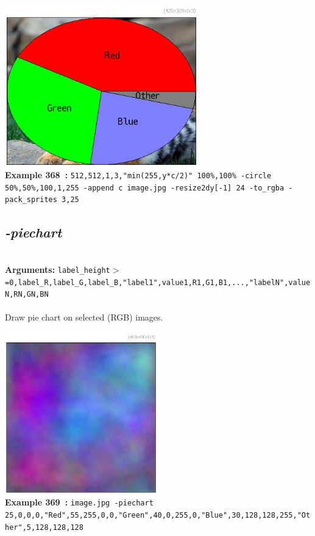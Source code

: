 \documentclass[a4paper,11pt,twoside]{book}
\begin{document}
\begin{center}\includegraphics[keepaspectratio=true,height=7cm,width=\textwidth]{img/gmic_def368.jpg}\\
{\footnotesize \textbf{Example 368~:} \texttt{512,512,1,3,"min(255,y*c/2)" 100\%,100\% -circle 50\%,50\%,100,1,255 -append c image.jpg -resize2dy[-1] 24 -to\_rgba -pack\_sprites 3,25}}
\end{center}

\subsection{\emph{-piechart} }\vspace*{-0.5em}
~\\\textbf{Arguments: } 
{\small \texttt{label\_height$>$=0,label\_R,label\_G,label\_B,"label1",value1,R1,G1,B1,...,"labelN",valueN,RN,GN,BN}}\\~\\
Draw pie chart on selected (RGB) images.
\begin{center}\includegraphics[keepaspectratio=true,height=7cm,width=\textwidth]{img/gmic_def369.jpg}\\
{\footnotesize \textbf{Example 369~:} \texttt{image.jpg -piechart 25,0,0,0,"Red",55,255,0,0,"Green",40,0,255,0,"Blue",30,128,128,255,"Other",5,128,128,128}}
\end{center}
\end{document}
